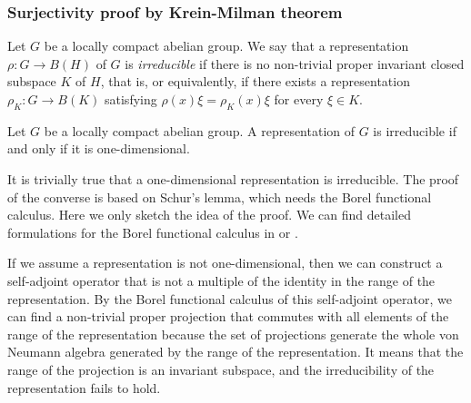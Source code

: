 \documentclass{../../small}
\begin{document}
\subsubsection*{Surjectivity proof by Krein-Milman theorem}
\fi


\begin{defn}
Let $G$ be a locally compact abelian group.
We say that a representation $\rho:G\to B(H)$ of $G$ is \emph{irreducible} if there is no non-trivial proper invariant closed subspace $K$ of $H$, that is, or equivalently, if there exists a representation $\rho_K:G\to B(K)$ satisfying $\rho(x)\xi=\rho_K(x)\xi$ for every $\xi\in K$.
\end{defn}
\begin{lem}
Let $G$ be a locally compact abelian group.
A representation of $G$ is irreducible if and only if it is one-dimensional.
\end{lem}
\begin{pf}
It is trivially true that a one-dimensional representation is irreducible.
The proof of the converse is based on Schur's lemma, which needs the Borel functional calculus.
Here we only sketch the idea of the proof.
We can find detailed formulations for the Borel functional calculus in \cite{murphy2014c} or \cite{conway2019course}.

If we assume a representation is not one-dimensional, then we can construct a self-adjoint operator that is not a multiple of the identity in the range of the representation.
By the Borel functional calculus of this self-adjoint operator, we can find a non-trivial proper projection that commutes with all elements of the range of the representation because the set of projections generate the whole von Neumann algebra generated by the range of the representation.
It means that the range of the projection is an invariant subspace, and the irreducibility of the representation fails to hold.
\end{pf}
\end{document}
